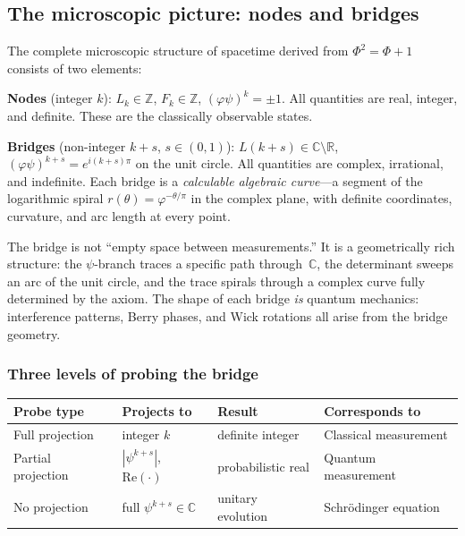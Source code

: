 \documentclass[12pt,a4paper]{article}
\begin{document}
\subsection{The microscopic picture: nodes and bridges}
\label{sec:double-helix}

The complete microscopic structure of spacetime derived from $\Phi^2 = \Phi + 1$ consists of two elements:

\textbf{Nodes} (integer $k$): $L_k \in \mathbb{Z}$, $F_k \in \mathbb{Z}$, $(\varphi\psi)^k = \pm 1$. All quantities are real, integer, and definite. These are the classically observable states.

\textbf{Bridges} (non-integer $k + s$, $s \in (0,1)$): $L(k{+}s) \in \mathbb{C} \setminus \mathbb{R}$, $(\varphi\psi)^{k+s} = e^{i(k+s)\pi}$ on the unit circle. All quantities are complex, irrational, and indefinite. Each bridge is a \emph{calculable algebraic curve}---a segment of the logarithmic spiral $r(\theta) = \varphi^{-\theta/\pi}$ in the complex plane, with definite coordinates, curvature, and arc length at every point.

The bridge is not ``empty space between measurements.'' It is a geometrically rich structure: the $\psi$-branch traces a specific path through~$\mathbb{C}$, the determinant sweeps an arc of the unit circle, and the trace spirals through a complex curve fully determined by the axiom. The shape of each bridge \emph{is} quantum mechanics: interference patterns, Berry phases, and Wick rotations all arise from the bridge geometry.

\subsubsection*{Three levels of probing the bridge}

\begin{center}
\begin{tabular}{|l|l|l|l|}
\hline
\textbf{Probe type} & \textbf{Projects to} & \textbf{Result} & \textbf{Corresponds to} \\
\hline
Full projection & integer $k$ & definite integer & Classical measurement \\
Partial projection & $|\psi^{k+s}|$, $\mathrm{Re}(\cdot)$ & probabilistic real & Quantum measurement \\
No projection & full $\psi^{k+s} \in \mathbb{C}$ & unitary evolution & Schr\"odinger equation \\
\hline
\end{tabular}
\end{center}
\end{document}
